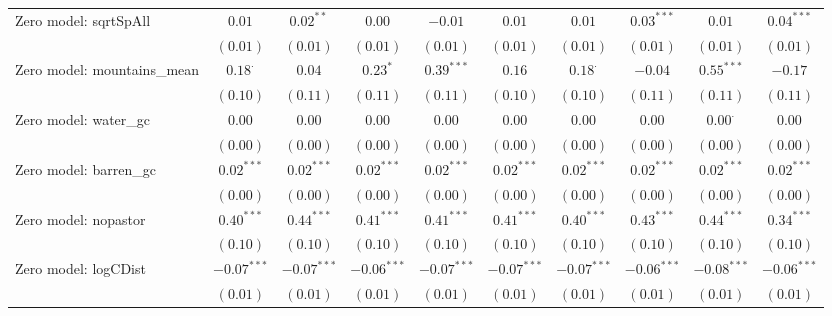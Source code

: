 \begin{sidewaystable}
\begin{center}
{\begin{tabular}{l c c c c c c c c c}
Zero model: sqrtSpAll          & $0.01$         & $0.02^{**}$   & $0.00$        & $-0.01$       & $0.01$        & $0.01$         & $0.03^{***}$  & $0.01$         & $0.04^{***}$  \\
                               & $(0.01)$       & $(0.01)$      & $(0.01)$      & $(0.01)$      & $(0.01)$      & $(0.01)$       & $(0.01)$      & $(0.01)$       & $(0.01)$      \\
Zero model: mountains\_mean    & $0.18^{\cdot}$ & $0.04$        & $0.23^{*}$    & $0.39^{***}$  & $0.16$        & $0.18^{\cdot}$ & $-0.04$       & $0.55^{***}$   & $-0.17$       \\
                               & $(0.10)$       & $(0.11)$      & $(0.11)$      & $(0.11)$      & $(0.10)$      & $(0.10)$       & $(0.11)$      & $(0.11)$       & $(0.11)$      \\
Zero model: water\_gc          & $0.00$         & $0.00$        & $0.00$        & $0.00$        & $0.00$        & $0.00$         & $0.00$        & $0.00^{\cdot}$ & $0.00$        \\
                               & $(0.00)$       & $(0.00)$      & $(0.00)$      & $(0.00)$      & $(0.00)$      & $(0.00)$       & $(0.00)$      & $(0.00)$       & $(0.00)$      \\
Zero model: barren\_gc         & $0.02^{***}$   & $0.02^{***}$  & $0.02^{***}$  & $0.02^{***}$  & $0.02^{***}$  & $0.02^{***}$   & $0.02^{***}$  & $0.02^{***}$   & $0.02^{***}$  \\
                               & $(0.00)$       & $(0.00)$      & $(0.00)$      & $(0.00)$      & $(0.00)$      & $(0.00)$       & $(0.00)$      & $(0.00)$       & $(0.00)$      \\
Zero model: nopastor           & $0.40^{***}$   & $0.44^{***}$  & $0.41^{***}$  & $0.41^{***}$  & $0.41^{***}$  & $0.40^{***}$   & $0.43^{***}$  & $0.44^{***}$   & $0.34^{***}$  \\
                               & $(0.10)$       & $(0.10)$      & $(0.10)$      & $(0.10)$      & $(0.10)$      & $(0.10)$       & $(0.10)$      & $(0.10)$       & $(0.10)$      \\
Zero model: logCDist           & $-0.07^{***}$  & $-0.07^{***}$ & $-0.06^{***}$ & $-0.07^{***}$ & $-0.07^{***}$ & $-0.07^{***}$  & $-0.06^{***}$ & $-0.08^{***}$  & $-0.06^{***}$ \\
                               & $(0.01)$       & $(0.01)$      & $(0.01)$      & $(0.01)$      & $(0.01)$      & $(0.01)$       & $(0.01)$      & $(0.01)$       & $(0.01)$      \\

\end{tabular}}
\end{center}
\end{sidewaystable}
